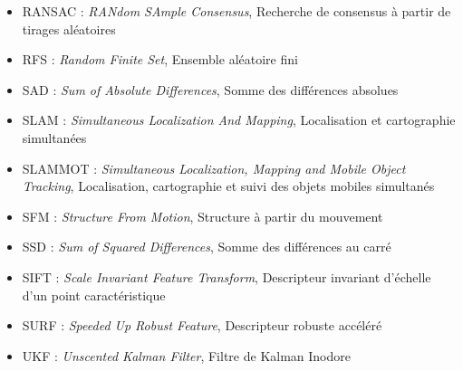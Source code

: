 \begin{itemize}
\item {RANSAC : \emph{RANdom SAmple Consensus}, Recherche de consensus à partir de tirages aléatoires\\}
\item {RFS : \emph{Random Finite Set}, Ensemble aléatoire fini \\}
\item {SAD : \emph{Sum of Absolute Differences}, Somme des différences absolues	\\}
\item {SLAM : \emph{Simultaneous Localization And Mapping}, Localisation et cartographie simultanées\\}
\item {SLAMMOT : \emph{Simultaneous Localization, Mapping and Mobile Object Tracking}, Localisation, cartographie et suivi des objets mobiles simultanés \\}
\item {SFM : \emph{Structure From Motion}, Structure à partir du mouvement	\\ }
\item {SSD : \emph{Sum of Squared Differences}, Somme des différences au carré\\}
\item {SIFT : \emph{Scale Invariant Feature Transform}, Descripteur invariant d'échelle d'un point caractéristique\\}
\item {SURF : \emph{Speeded Up Robust Feature}, Descripteur robuste accéléré\\}
\item {UKF : \emph{Unscented Kalman Filter}, Filtre de Kalman Inodore\\}
\end{itemize}